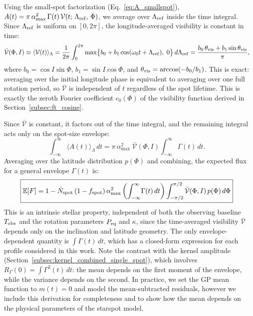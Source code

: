\documentclass[preprint]{aastex702}
\newcommand{\E}{\mathbb{E}}
\begin{document}
Using the small-spot factorization (Eq.~\ref{eq:A_smallspot}), $A(t) = \pi\,\alpha_{\max}^2\,\Gamma(t)\,\mathcal{V}(t;\,\Lambda_{\rm ref},\,\Phi)$, we average over $\Lambda_{\rm ref}$ inside the time integral. Since $\Lambda_{\rm ref}$ is uniform on $[0,2\pi]$, the longitude-averaged visibility is constant in time:
\begin{equation}
    \bar{\mathcal{V}}(\Phi, I) \equiv \langle \mathcal{V}(t) \rangle_\Lambda = \frac{1}{2\pi}\int_0^{2\pi} \max\!\big\{b_0 + b_1\cos(\omega_0 t + \Lambda_{\rm ref}),\;0\big\}\,d\Lambda_{\rm ref}
    = \frac{b_0\,\theta_{\rm vis} + b_1\sin\theta_{\rm vis}}{\pi},
    \label{eq:mean_visibility}
\end{equation}
where $b_0 = \cos I\sin\Phi$, $b_1 = \sin I\cos\Phi$, and $\theta_{\rm vis} = \arccos(-b_0/b_1)$. This is exact: averaging over the initial longitude phase is equivalent to averaging over one full rotation period, so $\bar{\mathcal{V}}$ is independent of $t$ regardless of the spot lifetime. This is exactly the zeroth Fourier coefficient $c_0(\Phi)$ of the visibility function derived in Section~\ref{subsec:ft_cosine}.

Since $\bar{\mathcal{V}}$ is constant, it factors out of the time integral, and the remaining integral acts only on the spot-size envelope:
\begin{equation}
    \int_{-\infty}^{\infty}\! \langle A(t) \rangle_\Lambda\,dt
    = \pi\,\alpha_{\max}^2\;\bar{\mathcal{V}}(\Phi,I)\int_{-\infty}^{\infty}\!\Gamma(t)\,dt.
\end{equation}
Averaging over the latitude distribution $p(\Phi)$ and combining, the expected flux for a general envelope $\Gamma(t)$ is:
\begin{equation}
    \boxed{
    \E[F] = 1 - \dot{N}_{\rm spot}\,(1 - f_{\rm spot})\,\alpha_{\max}^2\left(\int_{-\infty}^{\infty}\!\Gamma(t)\,dt\right)\int_{-\pi/2}^{\pi/2}\bar{\mathcal{V}}(\Phi, I)\,p(\Phi)\,d\Phi
    }
    \label{eq:mean_flux}
\end{equation}
This is an intrinsic stellar property, independent of both the observing baseline $T_{\rm obs}$ and the rotation parameters $P_{\rm eq}$ and $\kappa$, since the time-averaged visibility $\bar{\mathcal{V}}$ depends only on the inclination and latitude geometry. The only envelope-dependent quantity is $\int\Gamma(t)\,dt$, which has a closed-form expression for each profile considered in this work. Note the contrast with the kernel amplitude (Section~\ref{subsec:kernel_combined_single_spot}), which involves $R_\Gamma(0) = \int\Gamma^2(t)\,dt$: the mean depends on the first moment of the envelope, while the variance depends on the second. In practice, we set the GP mean function to $m(t) = 0$ and model the mean-subtracted residuals, however we include this derivation for completeness and to show how the mean depends on the physical parameters of the starspot model.
\end{document}
